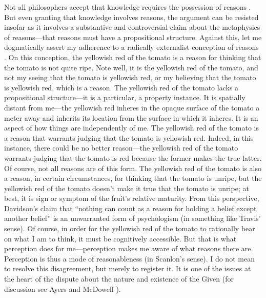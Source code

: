 \documentclass[12pt]{article}
\begin{document}
Not all philosophers accept that knowledge requires the possession of reasons \citep[see][]{Pryor:2007fk}. But even granting that knowledge involves reasons, the argument can be resisted insofar as it involves a substantive and controversial claim about the metaphysics of reasons---that reasons must have a propositional structure. Against this, let me dogmatically assert my adherence to a radically externalist conception of reasons \citep[see][]{Scanlon:1998hb,Raz:2000tm}. On this conception, the yellowish red of the tomato is a reason for thinking that the tomato is not quite ripe. Note well, it is the yellowish red of the tomato, and not my seeing that the tomato is yellowish red, or my believing that the tomato is yellowish red, which is a reason. The yellowish red of the tomato lacks a propositional structure---it is a particular, a property instance. It is spatially distant from me---the yellowish red inheres in the opaque surface of the tomato a meter away and inherits its location from the surface in which it inheres. It is an aspect of how things are independently of me. The yellowish red of the tomato is a reason that warrants judging that the tomato is yellowish red. Indeed, in this instance, there could be no better reason---the yellowish red of the tomato warrants judging that the tomato is red because the former makes the true latter. Of course, not all reasons are of this form. The yellowish red of the tomato is also a reason, in certain circumstances, for thinking that the tomato is unripe, but the yellowish red of the tomato doesn't make it true that the tomato is unripe; at best, it is sign or symptom of the fruit's relative maturity. From this perspective, Davidson's \citeyearpar[310]{Davidson:1986uq} claim that ``nothing can count as a reason for holding a belief except another belief'' is an unwarranted form of psychologism (in something like Travis' \citeyear{Travis:2006fk} sense). Of course, in order for the yellowish red of the tomato to rationally bear on what I am to think, it must be cognitively accessible. But that is what perception does for me---perception makes me aware of what reasons there are. Perception is thus a mode of reasonableness (in Scanlon's \citeyear[]{Scanlon:1998hb} sense). I do not mean to resolve this disagreement, but merely to register it. It is one of the issues at the heart of the dispute about the nature and existence of the Given (for discussion see Ayers \citeyear{Ayers:2004kx} and McDowell \citeyear{McDowell:2006vn}).
\end{document}
